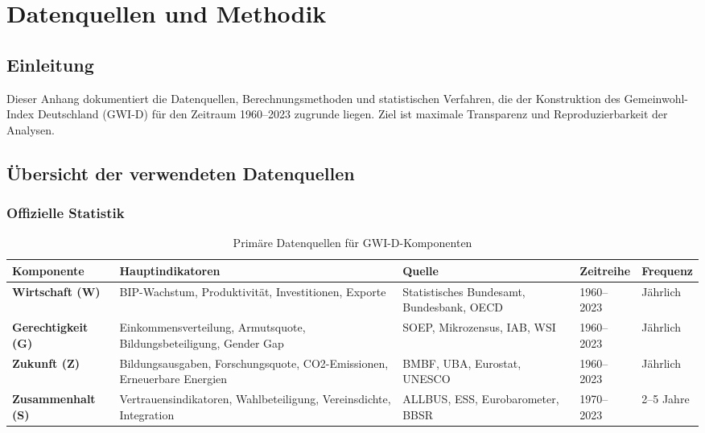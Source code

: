 \chapter{Datenquellen und Methodik}
\label{chap:anhang_a}

\section*{Einleitung}
Dieser Anhang dokumentiert die Datenquellen, Berechnungsmethoden und statistischen Verfahren, die der Konstruktion des Gemeinwohl-Index Deutschland (GWI-D) für den Zeitraum 1960–2023 zugrunde liegen. Ziel ist maximale Transparenz und Reproduzierbarkeit der Analysen.

\section{Übersicht der verwendeten Datenquellen}

\subsection{Offizielle Statistik}

\begin{table}[ht]
    \centering
    \caption{Primäre Datenquellen für GWI-D-Komponenten}
    \label{tab:datenquellen_gwi}
    \begin{tabular}{lllp{6cm}l}
        \toprule
        \textbf{Komponente} & \textbf{Hauptindikatoren} & \textbf{Quelle} & \textbf{Zeitreihe} & \textbf{Frequenz} \\
        \midrule
        \textbf{Wirtschaft (W)} & BIP-Wachstum, Produktivität, Investitionen, Exporte & Statistisches Bundesamt, Bundesbank, OECD & 1960–2023 & Jährlich \\
        \textbf{Gerechtigkeit (G)} & Einkommensverteilung, Armutsquote, Bildungsbeteiligung, Gender Gap & SOEP, Mikrozensus, IAB, WSI & 1960–2023 & Jährlich \\
        \textbf{Zukunft (Z)} & Bildungsausgaben, Forschungsquote, CO2-Emissionen, Erneuerbare Energien & BMBF, UBA, Eurostat, UNESCO & 1960–2023 & Jährlich \\
        \textbf{Zusammenhalt (S)} & Vertrauensindikatoren, Wahlbeteiligung, Vereinsdichte, Integration & ALLBUS, ESS, Eurobarometer, BBSR & 1970–2023 & 2–5 Jahre \\
        \bottomrule
    \end{tabular}
\end{table}

